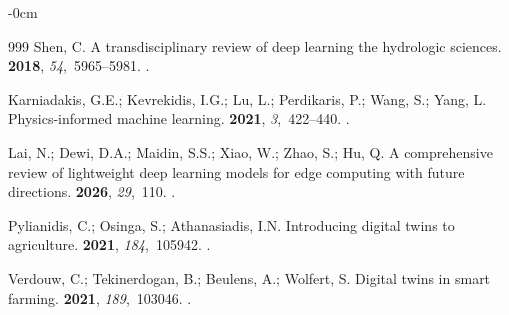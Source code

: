 \documentclass[land,review,accept,pdftex,oneauthor]{Definitions/mdpi}
\begin{document}
\begin{adjustwidth}{-\extralength}{0cm}
\begin{thebibliography}{999}
Shen, C.
\newblock A transdisciplinary review of deep learning the hydrologic sciences.
 {\bf 2018}, {\em 54},~5965--5981.
.

Karniadakis, G.E.; Kevrekidis, I.G.; Lu, L.; Perdikaris, P.; Wang, S.;  Yang,  L.
\newblock Physics-informed machine learning. %
 {\bf 2021}, {\em 3},~422--440.
.

Lai, N.; Dewi, D.A.; Maidin, S.S.; Xiao, W.; Zhao, S.; Hu, Q.
\newblock A comprehensive review of lightweight deep learning models for edge
  computing with future directions.
 {\bf 2026}, {\em 29},~110.
.

Pylianidis, C.; Osinga, S.; Athanasiadis, I.N.
\newblock Introducing digital twins to agriculture. %
 {\bf 2021}, {\em
  184},~105942.
.

Verdouw, C.; Tekinerdogan, B.; Beulens, A.; Wolfert, S.
\newblock Digital twins in smart farming. %
 {\bf 2021}, {\em 189},~103046.
.


\end{thebibliography}
\end{adjustwidth}
\end{document}
